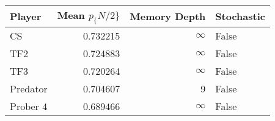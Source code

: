 \begin{tabular}{lrrl}
\toprule
   Player &  Mean $p_\{N/2\}$ &  Memory Depth & Stochastic \\
\midrule
       CS &        0.732215 &            \(\infty\) &      False \\
      TF2 &        0.724883 &            \(\infty\) &      False \\
      TF3 &        0.720264 &            \(\infty\) &      False \\
 Predator &        0.704607 &             9 &      False \\
 Prober 4 &        0.689466 &            \(\infty\) &      False \\
\bottomrule
\end{tabular}
